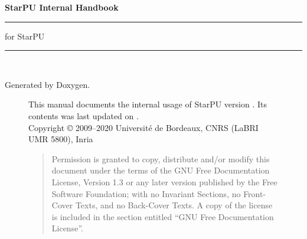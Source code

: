 %
%
%
%
%

\setlength{\parskip}{0pt}
\begin{titlepage}
\vspace*{4cm}
{\Huge \textbf{StarPU Internal Handbook}}\\
\rule{\textwidth}{1.5mm}
\begin{flushright}
{\Large for StarPU \STARPUVERSION}
\end{flushright}
\rule{\textwidth}{1mm}
~\\
\vspace*{15cm}
\begin{flushright}
Generated by Doxygen.
\end{flushright}
\end{titlepage}

\begin{figure}[p]
This manual documents the internal usage of StarPU version \STARPUVERSION. Its contents
was last updated on \STARPUUPDATED.\\

Copyright © 2009–2020 Université de Bordeaux, CNRS (LaBRI UMR 5800), Inria

\medskip

\begin{quote}
Permission is granted to copy, distribute and/or modify this document
under the terms of the GNU Free Documentation License, Version 1.3 or
any later version published by the Free Software Foundation; with no
Invariant Sections, no Front-Cover Texts, and no Back-Cover Texts. A
copy of the license is included in the section entitled “GNU Free
Documentation License”.
\end{quote}
\end{figure}

\setcounter{tocdepth}{2}
\tableofcontents
{}
\hypersetup{pageanchor=true,citecolor=blue}

